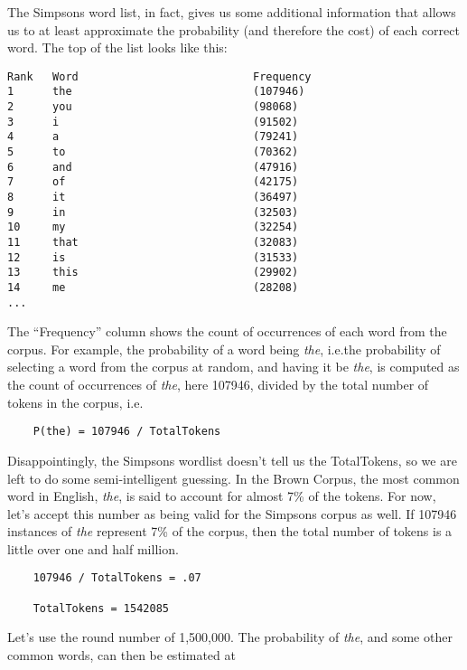 The Simpsons word list, in fact, gives us some additional information that allows
us to at least approximate the probability (and therefore the cost) of each
correct word.  The top of the list looks like this:

\begin{Verbatim}
Rank   Word                           Frequency
1      the                            (107946)
2      you                            (98068)
3      i                              (91502)
4      a                              (79241)
5      to                             (70362)
6      and                            (47916)
7      of                             (42175)
8      it                             (36497)
9      in                             (32503)
10     my                             (32254)
11     that                           (32083)
12     is                             (31533)
13     this                           (29902)
14     me                             (28208)
...
\end{Verbatim}

\noindent
The ``Frequency'' column shows the count of occurrences of each word from the
corpus.  For example, the probability of a word being \emph{the}, i.e.\@ the probability of
selecting a word from the corpus at random, and having it be \emph{the}, is
computed as the count of occurrences of \emph{the}, here 107946, divided by the
total number of tokens in the corpus, i.e.\@

\begin{Verbatim}
	P(the) = 107946 / TotalTokens
\end{Verbatim}

\noindent
Disappointingly, the Simpsons wordlist doesn't tell us the TotalTokens,
so we are left to do some semi-intelligent guessing.  In the Brown Corpus, the
most common word in English, 
\emph{the}, is said to account for almost 7\% of the tokens.  For now, let's accept
this number as being valid for the Simpsons corpus as well.  If 107946 instances of \emph{the}
represent 7\% of the corpus, then the total number of tokens is a little over one and half
million.

\begin{Verbatim}
	107946 / TotalTokens = .07

	TotalTokens = 1542085
\end{Verbatim}

\noindent
Let's use the round number of 1,500,000.  The probability of \emph{the}, and some
other common words, can then be estimated at

